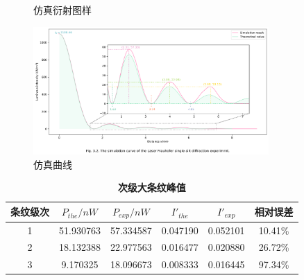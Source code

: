 \documentclass[12pt,a4paper,UTF8]{ctexart}
\begin{document}
\begin{figure}[htbp]
	\centering
	\caption{仿真衍射图样}
	\label{fig:3.1}
\end{figure}

\begin{figure}[htbp]
	\centering
	\includegraphics[width=0.8\textwidth]{attachments//Fig.3.2.png}
	\caption{仿真曲线}
	\label{fig:3.2}
\end{figure}

\begin{table}[htbp]
	\centering
	\begin{tabular}{cccccc}
	\toprule
	条纹级次 &$P_{the}/nW$ &$P_{exp}/nW$ &$I'_{the}$ &$I'_{exp}$ &相对误差 \\
	\midrule
	1  &51.930763  &57.334587  &0.047190  &0.052101  &10.41\%	\\	
	2  &18.132388  &22.977563  &0.016477  &0.020880  &26.72\%	\\
	3  & 9.170325  &18.096673  &0.008333  &0.016445  &97.34\%	\\
	\bottomrule
    \end{tabular}
	\caption{\textbf{次级大条纹峰值}}
	\label{tab:3.1}
\end{table}
\end{document}
